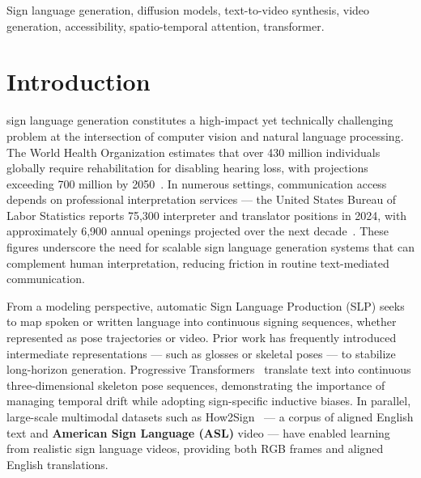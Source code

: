 \documentclass{ieeeaccess}
\begin{document}
\begin{keywords}
Sign language generation, diffusion models, text-to-video synthesis, video generation, accessibility, spatio-temporal attention, transformer.
\end{keywords}

\titlepgskip=-21pt

\maketitle

\section{Introduction}
\label{sec:introduction}

 sign language generation constitutes a high-impact yet technically challenging problem at the intersection of computer vision and natural language processing. The World Health Organization estimates that over 430 million individuals globally require rehabilitation for disabling hearing loss, with projections exceeding 700 million by 2050~\cite{who2025deafness}. In numerous settings, communication access depends on professional interpretation services — the United States Bureau of Labor Statistics reports 75,300 interpreter and translator positions in 2024, with approximately 6,900 annual openings projected over the next decade~\cite{bls2025interpreters}. These figures underscore the need for scalable sign language generation systems that can complement human interpretation, reducing friction in routine text-mediated communication.

From a modeling perspective, automatic Sign Language Production (SLP) seeks to map spoken or written language into continuous signing sequences, whether represented as pose trajectories or video. Prior work has frequently introduced intermediate representations — such as glosses or skeletal poses — to stabilize long-horizon generation. Progressive Transformers~\cite{saunders2020progressive} translate text into continuous three-dimensional skeleton pose sequences, demonstrating the importance of managing temporal drift while adopting sign-specific inductive biases. In parallel, large-scale multimodal datasets such as How2Sign~\cite{duarte2021how2sign} — a corpus of aligned English text and \textbf{American Sign Language (ASL)} video — have enabled learning from realistic sign language videos, providing both RGB frames and aligned English translations.
\end{document}
